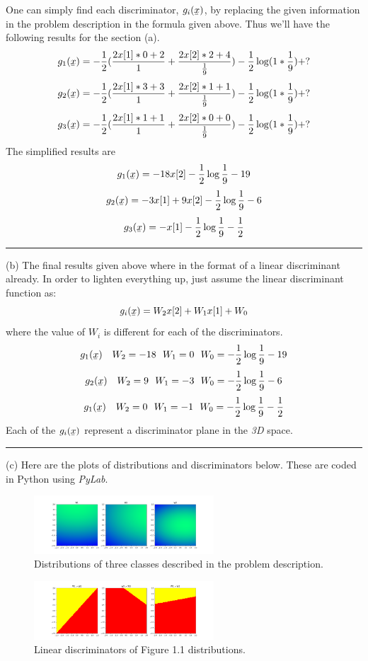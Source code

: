 \documentclass[12pt]{article}
\numberwithin{equation}{section}
\numberwithin{table}{section}
\numberwithin{figure}{section}
\begin{document}
One can simply find each discriminator, $g_{i}(\underaccent{\bar}{x})$, by replacing the given information in the problem description in the formula given above. Thus we'll have the following results for the section (a).
$$
	g_{1}(\underaccent{\bar}{x}) = -\frac{1}{2}(\frac{2x[1]*0 + 2}{1} + \frac{2x[2]*2 + 4}{\frac{1}{9}}) - \frac{1}{2}\log(1*\frac{1}{9}) + ?
$$
$$
g_{2}(\underaccent{\bar}{x}) = -\frac{1}{2}(\frac{2x[1]*3 + 3}{1} + \frac{2x[2]*1 + 1}{\frac{1}{9}}) - \frac{1}{2}\log(1*\frac{1}{9}) + ?
$$
$$
g_{3}(\underaccent{\bar}{x}) = -\frac{1}{2}(\frac{2x[1]*1 + 1}{1} + \frac{2x[2]*0 + 0}{\frac{1}{9}}) - \frac{1}{2}\log(1*\frac{1}{9}) + ?
$$
The simplified results are
$$
	g_{1}(\underaccent{\bar}{x}) = -18x[2] - \frac{1}{2}\log\frac{1}{9} - 19
$$
$$
	g_{2}(\underaccent{\bar}{x}) = -3x[1] + 9x[2] - \frac{1}{2}\log\frac{1}{9} - 6
$$
$$
	g_{3}(\underaccent{\bar}{x}) = -x[1] - \frac{1}{2}\log\frac{1}{9} - \frac{1}{2}
$$
\noindent\rule{\textwidth}{.5pt}
(b) The final results given above where in the format of a linear discriminant already. In order to lighten everything up, just assume the linear discriminant function as:
$$
	g_{i}(\underaccent{\bar}{x}) = W_{2}x[2] + W_{1}x[1] + W_0
$$
where the value of $W_i$ is different for each of the discriminators.
$$
	g_{1}(\underaccent{\bar}{x}) \ \ \ W_2 = -18 \ \ W_1 = 0 \ \ W_0 =  - \frac{1}{2}\log\frac{1}{9} - 19
$$
$$
g_{2}(\underaccent{\bar}{x}) \ \ \ W_2 = 9 \ \ W_1 = -3 \ \ W_0 =  - \frac{1}{2}\log\frac{1}{9} - 6
$$
$$
g_{1}(\underaccent{\bar}{x}) \ \ \ W_2 = 0 \ \ W_1 = -1 \ \ W_0 =  - \frac{1}{2}\log\frac{1}{9} - \frac{1}{2}
$$
Each of the $g_{i}(\underaccent{\bar}{x})$ represent a discriminator plane in the \textit{3D} space.

\noindent\rule{\textwidth}{.5pt}
(c) Here are the plots of distributions and discriminators below. These are coded in Python using \textit{PyLab}.
\begin{figure}[!h]\centering
	\includegraphics[width=0.6\textwidth]{1_c_1.png}
	\caption{Distributions of three classes described in the problem description.}
	\label{pl1}
\end{figure}
\begin{figure}[!h]\centering
	\includegraphics[width=0.6\textwidth]{1_c_2.png}
	\caption{Linear discriminators of Figure 1.1 distributions.}
	\label{pl2}
\end{figure}
\end{document}
